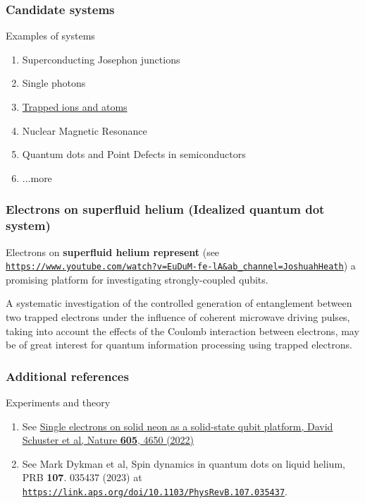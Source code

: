 \documentclass{beamer}
\begin{document}
\begin{frame}
\frametitle{Candidate systems}

\begin{block}{Examples of systems}
\begin{enumerate}
\item Superconducting Josephon junctions

\item Single photons

\item \href{{https://journals.aps.org/rmp/pdf/10.1103/RevModPhys.93.025001}}{Trapped ions and atoms}

\item Nuclear Magnetic Resonance

\item Quantum dots and Point Defects in semiconductors

\item ...more
\end{enumerate}
\end{block}
\end{frame}

\begin{frame}
\frametitle{Electrons on superfluid helium (Idealized quantum dot system)}
\begin{block}{}
Electrons on \textbf{superfluid helium represent} (see \href{{https://www.youtube.com/watch?v=EuDuM-fe-lA&ab_channel=JoshuahHeath}}{\nolinkurl{https://www.youtube.com/watch?v=EuDuM-fe-lA&ab_channel=JoshuahHeath}}) a promising platform for investigating
strongly-coupled qubits.
\end{block}
\begin{block}{}
A systematic investigation of the
controlled generation of entanglement between two trapped electrons
under the influence of coherent microwave driving pulses, taking into
account the effects of the Coulomb interaction between electrons, may be of great interest for quantum information processing using
trapped electrons.
\end{block}
\end{frame}

\begin{frame}
\frametitle{Additional references}
\begin{block}{Experiments and theory}
\begin{enumerate}
\item See \href{{https://www.nature.com/articles/s41586-022-04539-x}}{Single electrons on solid neon as a solid-state qubit platform, David Schuster et al, Nature \textbf{605}, 4650 (2022)}

\item See Mark Dykman et al, Spin dynamics in quantum dots on liquid helium, PRB \textbf{107}. 035437 (2023) at \href{{https://link.aps.org/doi/10.1103/PhysRevB.107.035437}}{\nolinkurl{https://link.aps.org/doi/10.1103/PhysRevB.107.035437}}.
\end{enumerate}
\end{block}
\end{frame}
\end{document}
